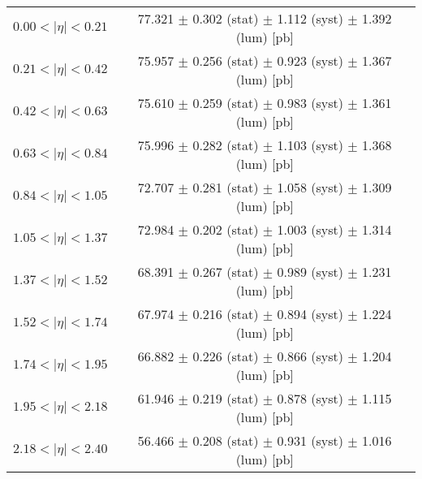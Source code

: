 \begin{tabular}{lc}
\hline
$0.00 < |\eta| <0.21$          & 77.321 $\pm$ 0.302 (stat) $\pm$ 1.112 (syst) $\pm$ 1.392 (lum) [pb]  \\
$0.21 < |\eta| <0.42$          & 75.957 $\pm$ 0.256 (stat) $\pm$ 0.923 (syst) $\pm$ 1.367 (lum) [pb]  \\
$0.42 < |\eta| <0.63$          & 75.610 $\pm$ 0.259 (stat) $\pm$ 0.983 (syst) $\pm$ 1.361 (lum) [pb]  \\
$0.63 < |\eta| <0.84$          & 75.996 $\pm$ 0.282 (stat) $\pm$ 1.103 (syst) $\pm$ 1.368 (lum) [pb]  \\
$0.84 < |\eta| <1.05$          & 72.707 $\pm$ 0.281 (stat) $\pm$ 1.058 (syst) $\pm$ 1.309 (lum) [pb]  \\
$1.05 < |\eta| <1.37$          & 72.984 $\pm$ 0.202 (stat) $\pm$ 1.003 (syst) $\pm$ 1.314 (lum) [pb]  \\
$1.37 < |\eta| <1.52$          & 68.391 $\pm$ 0.267 (stat) $\pm$ 0.989 (syst) $\pm$ 1.231 (lum) [pb]  \\
$1.52 < |\eta| <1.74$          & 67.974 $\pm$ 0.216 (stat) $\pm$ 0.894 (syst) $\pm$ 1.224 (lum) [pb]  \\
$1.74 < |\eta| <1.95$          & 66.882 $\pm$ 0.226 (stat) $\pm$ 0.866 (syst) $\pm$ 1.204 (lum) [pb]  \\
$1.95 < |\eta| <2.18$          & 61.946 $\pm$ 0.219 (stat) $\pm$ 0.878 (syst) $\pm$ 1.115 (lum) [pb]  \\
$2.18 < |\eta| <2.40$          & 56.466 $\pm$ 0.208 (stat) $\pm$ 0.931 (syst) $\pm$ 1.016 (lum) [pb]  \\
\hline
\end{tabular}
